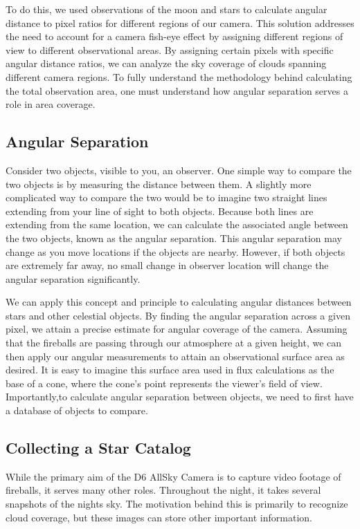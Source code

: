 To do this, we used observations of the moon and stars to calculate angular distance to pixel ratios for different regions of our camera.
This solution addresses the need to account for a camera fish-eye effect by assigning different regions of view to different observational areas.
By assigning certain pixels with specific angular distance ratios, we can analyze the sky coverage of clouds spanning different camera regions.
To fully understand the methodology behind calculating the total observation area, one must understand how angular separation serves a role in area coverage.

\subsection{Angular Separation}

Consider two objects, visible to you, an observer.
One simple way to compare the two objects is by measuring the distance between them.  
A slightly more complicated way to compare the two would be to imagine two straight lines extending from your line of sight to both objects.  
Because both lines are extending from the same location, we can calculate the associated angle between the two objects, known as the angular separation.
This angular separation may change as you move locations if the objects are nearby. However, if both objects are extremely far away, no small change in observer location will change the angular separation significantly.

We can apply this concept and principle to calculating angular distances between stars and other celestial objects.
By finding the angular separation across a given pixel, we attain a precise estimate for angular coverage of the camera.  
Assuming that the fireballs are passing through our atmosphere at a given height, we can then apply our angular measurements to attain an observational surface area as desired.
It is easy to imagine this surface area used in flux calculations as the base of a cone, where the cone's point represents the viewer's field of view.
Importantly,to calculate angular separation between objects, we need to first have a database of objects to compare.

\subsection{Collecting a Star Catalog}

While the primary aim of the D6 AllSky Camera is to capture video footage of fireballs, it serves many other roles.  
Throughout the night, it takes several snapshots of the nights sky. 
The motivation behind this is primarily to recognize cloud coverage, but these images can store other important information.

